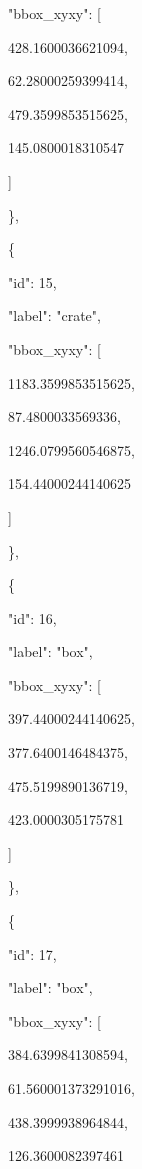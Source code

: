 \documentclass[10pt,a4paper]{article}
\begin{document}
      "bbox\_xyxy":\allowbreak{} [\par
        428.1600036621094,\allowbreak{}\par
        62.28000259399414,\allowbreak{}\par
        479.3599853515625,\allowbreak{}\par
        145.0800018310547\par
      ]\par
    \},\allowbreak{}\par
    \{\par
      "id":\allowbreak{} 15,\allowbreak{}\par
      "label":\allowbreak{} "crate",\allowbreak{}\par
      "bbox\_xyxy":\allowbreak{} [\par
        1183.3599853515625,\allowbreak{}\par
        87.4800033569336,\allowbreak{}\par
        1246.0799560546875,\allowbreak{}\par
        154.44000244140625\par
      ]\par
    \},\allowbreak{}\par
    \{\par
      "id":\allowbreak{} 16,\allowbreak{}\par
      "label":\allowbreak{} "box",\allowbreak{}\par
      "bbox\_xyxy":\allowbreak{} [\par
        397.44000244140625,\allowbreak{}\par
        377.6400146484375,\allowbreak{}\par
        475.5199890136719,\allowbreak{}\par
        423.0000305175781\par
      ]\par
    \},\allowbreak{}\par
    \{\par
      "id":\allowbreak{} 17,\allowbreak{}\par
      "label":\allowbreak{} "box",\allowbreak{}\par
      "bbox\_xyxy":\allowbreak{} [\par
        384.6399841308594,\allowbreak{}\par
        61.560001373291016,\allowbreak{}\par
        438.3999938964844,\allowbreak{}\par
        126.3600082397461\par
\end{document}
